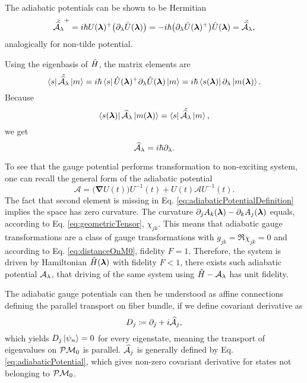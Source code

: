 The adiabatic potentials can be shown to be Hermitian
\begin{equation}
     \tilde{\AA_\lambda}^+=i\hbar U(\llambda)^+\big(\partial_\lambda\U(\llambda)\big)=-i\hbar\big(\partial_\lambda\U(\llambda)^+\big)\U(\llambda) = \tilde{\AA_\lambda},
     \label{eq:counterdiabaticPotentialTwoSystems}
\end{equation}
analogically for non-tilde potential.

Using the eigenbasis of $\HH$, the matrix elements are
\begin{equation}
    \bra{s}\tilde{\AA_\lambda}\ket{m}=i\hbar\bra{s}\U(\llambda)^+\partial_\lambda\U(\llambda)\ket{m} = i\hbar\bra{s(\llambda)}\partial_\lambda\ket{m(\llambda)}.
\end{equation}
Because
\begin{equation}
    \bra{s(\llambda)}\AA_\lambda\ket{ m(\llambda)}= \bra{s}\tilde{\AA_\lambda}\ket{m},
\end{equation}
we get
\begin{equation}
    \AA_\lambda = i\hbar\partial_\lambda.
    \label{eq:adiabaticPotentialDefinition}
\end{equation}


To see that the gauge potential performs transformation to non-exciting system, one can recall the general form of the adiabatic potential
\begin{equation}
    \bm{\mathcal A}=\big(\bm\nabla U(t)\big)U^{-1}(t) + U(t) \bm{\mathcal A} U^{-1}(t).
\end{equation}
The fact that second element is missing in Eq. \ref{eq:adiabaticPotentialDefinition} implies the space has zero curvature. The curvature $\partial_j A_k(\llambda)-\partial_k A_j(\llambda)$ equals, according to Eq. \ref{eq:geometricTensor}, $\chi_{jk}$.
This means that adiabatic gauge transformations are a class of gauge transformations with $g_{jk}=\Re\chi_{jk}=0$ and according to Eq. \ref{eq:distanceOnM0}, fidelity $F=1$. Therefore, the system is driven by Hamiltonian $\HH(\llambda)$ with fidelity $F<1$, there exists such adiabatic potential $\A_\lambda$, that driving of the same system using $\HH-\A_\lambda$ has unit fidelity.

The adiabatic gauge potentials can then be understood as affine connections defining the parallel transport on fiber bundle, if we define covariant derivative as
\begin{equation}
    D_j\coloneqq\partial_j+i\AA_j,
\end{equation}
which yields $D_j\ket{\psi_n}=0$ for every eigenstate, meaning the transport of eigenvalues on $\P\M_0$ is parallel. $\AA_j$ is generally defined by Eq. \ref{eq:adiabaticPotential}, which gives non-zero covariant derivative for states not belonging to $\P\M_0$. 







